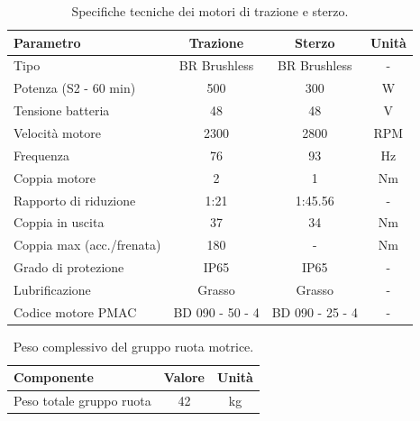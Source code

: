 \begin{table}[htbp]
    \centering
    \caption{Specifiche tecniche dei motori di trazione e sterzo.}
    \label{tab:motors_data}
    \begin{tabular}{|l|c|c|c|}
        \hline
        \textbf{Parametro}        & \textbf{Trazione} & \textbf{Sterzo} & \textbf{Unità} \\
        \hline
        Tipo                      & BR Brushless      & BR Brushless    & -              \\
        Potenza (S2 - 60 min)     & 500               & 300             & W              \\
        Tensione batteria         & 48                & 48              & V              \\
        Velocità motore           & 2300              & 2800            & RPM            \\
        Frequenza                 & 76                & 93              & Hz             \\
        Coppia motore             & 2                 & 1               & Nm             \\
        Rapporto di riduzione     & 1:21              & 1:45.56         & -              \\
        Coppia in uscita          & 37                & 34              & Nm             \\
        Coppia max (acc./frenata) & 180               & -               & Nm             \\
        Grado di protezione       & IP65              & IP65            & -              \\
        Lubrificazione            & Grasso            & Grasso          & -              \\
        Codice motore PMAC        & BD 090 - 50 - 4   & BD 090 - 25 - 4 & -              \\
        \hline
    \end{tabular}
\end{table}

\begin{table}[htbp]
    \centering
    \caption{Peso complessivo del gruppo ruota motrice.}
    \label{tab:drive_unit_weight}
    \begin{tabular}{|l|c|c|}
        \hline
        \textbf{Componente}      & \textbf{Valore} & \textbf{Unità} \\
        \hline
        Peso totale gruppo ruota & 42              & kg             \\
        \hline
    \end{tabular}
\end{table}

